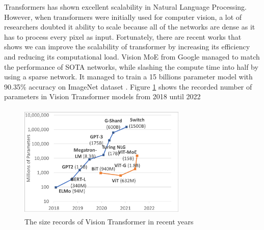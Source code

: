 \begin{enumerate}
    Transformers has shown excellent scalability in Natural Language Processing. However, when transformers were initially used for computer vision, a lot of researchers doubted it ability to scale because all of the networks are dense as it has to process every pixel as input. Fortunately, there are recent works that shows we can improve the scalability of transformer by increasing its efficiency and reducing its computational load. Vision MoE from Google managed to match the performance of SOTA networks, while slashing the compute time into half by using a sparse network. It managed to train a 15 billions parameter model with 90.35\% accuracy on ImageNet dataset \cite{scaling-sparse}. Figure \ref{fig:scaling} shows the recorded number of parameters in Vision Transformer models from 2018 until 2022

\begin{figure}[ht]
\includegraphics[width=8cm, height=5.5cm]{images/scaling.png}
\centering
\caption{The size records of Vision Transformer in recent years}
\label{fig:scaling}
\end{figure}
\end{enumerate}


